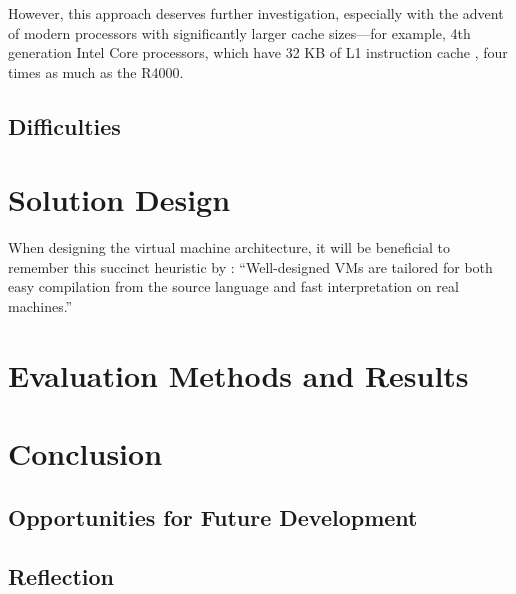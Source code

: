 		However, this approach deserves further investigation, especially with the advent of modern processors with significantly larger cache sizes---for example, 4th generation Intel Core processors, which have 32 KB of L1 instruction cache \citep{haswellarch}, four times as much as the R4000.
	
	\section{Difficulties}

\chapter{Solution Design}
	When designing the virtual machine architecture, it will be beneficial to remember this succinct heuristic by \cite{structureinterpreters}: ``Well-designed VMs are tailored for both easy compilation from the source language and fast interpretation on real machines.''

\chapter{Evaluation Methods and Results}

\chapter{Conclusion}
	
	\section{Opportunities for Future Development}
	
	\section{Reflection}

\bibliographysection

